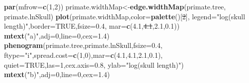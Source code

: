 \documentclass[fleqn,10pt,lineno]{wlpeerj}
\newenvironment{Shaded}{\begin{snugshade}}{\end{snugshade}}
\newcommand{\AttributeTok}[1]{\textcolor[rgb]{0.13,0.29,0.53}{#1}}
\newcommand{\ConstantTok}[1]{\textcolor[rgb]{0.56,0.35,0.01}{#1}}
\newcommand{\DecValTok}[1]{\textcolor[rgb]{0.00,0.00,0.81}{#1}}
\newcommand{\FloatTok}[1]{\textcolor[rgb]{0.00,0.00,0.81}{#1}}
\newcommand{\FunctionTok}[1]{\textcolor[rgb]{0.13,0.29,0.53}{\textbf{#1}}}
\newcommand{\NormalTok}[1]{#1}
\newcommand{\OtherTok}[1]{\textcolor[rgb]{0.56,0.35,0.01}{#1}}
\newcommand{\StringTok}[1]{\textcolor[rgb]{0.31,0.60,0.02}{#1}}
\providecommand{\DIFaddtex}[1]{{\protect\color{blue}\uwave{#1}}} %
\providecommand{\DIFdeltex}[1]{{\protect\color{red}\sout{#1}}}                      %
\providecommand{\DIFaddbegin}{} %
\providecommand{\DIFaddend}{} %
\providecommand{\DIFdelbegin}{} %
\providecommand{\DIFdelend}{} %
\providecommand{\DIFadd}[1]{\texorpdfstring{\DIFaddtex{#1}}{#1}} %
\providecommand{\DIFdel}[1]{\texorpdfstring{\DIFdeltex{#1}}{}} %
\newcommand{\DIFscaledelfig}{0.5}
\newlength{\DIFdelgraphicswidth} %
\newlength{\DIFdelgraphicsheight} %
\newcommand{\DIFaddincludegraphics}[2][]{{\color{blue}\fbox{\DIFOincludegraphics[#1]{#2}}}} %
\newcommand{\DIFdelincludegraphics}[2][]{%
\sbox{\DIFdelgraphicsbox}{\DIFOincludegraphics[#1]{#2}}%
\settoboxwidth{\DIFdelgraphicswidth}{\DIFdelgraphicsbox} %
\settoboxtotalheight{\DIFdelgraphicsheight}{\DIFdelgraphicsbox} %
\scalebox{\DIFscaledelfig}{%
\parbox[b]{\DIFdelgraphicswidth}{\usebox{\DIFdelgraphicsbox}\\[-\baselineskip] \rule{\DIFdelgraphicswidth}{0em}}\llap{\resizebox{\DIFdelgraphicswidth}{\DIFdelgraphicsheight}{%
\setlength{\unitlength}{\DIFdelgraphicswidth}%
\begin{picture}(1,1)%
\thicklines\linethickness{2pt} %
{\color[rgb]{1,0,0}\put(0,0){\framebox(1,1){}}}%
{\color[rgb]{1,0,0}\put(0,0){\line( 1,1){1}}}%
{\color[rgb]{1,0,0}\put(0,1){\line(1,-1){1}}}%
\end{picture}%
}\hspace*{3pt}}} %
} %
\DeclareRobustCommand{\DIFaddbegin}{\DIFOaddbegin \let\includegraphics\DIFaddincludegraphics} %
\DeclareRobustCommand{\DIFaddend}{\DIFOaddend \let\includegraphics\DIFOincludegraphics} %
\DeclareRobustCommand{\DIFdelbegin}{\DIFOdelbegin \let\includegraphics\DIFdelincludegraphics} %
\DeclareRobustCommand{\DIFdelend}{\DIFOaddend \let\includegraphics\DIFOincludegraphics} %
\begin{document}
\begin{Shaded}
\begin{Highlighting}[]
\FunctionTok{par}\NormalTok{(}\AttributeTok{mfrow=}\FunctionTok{c}\NormalTok{(}\DecValTok{1}\NormalTok{,}\DecValTok{2}\NormalTok{))}
\NormalTok{primate.widthMap}\OtherTok{\textless{}{-}}\FunctionTok{edge.widthMap}\NormalTok{(primate.tree,}
\NormalTok{  primate.lnSkull)}
\FunctionTok{plot}\NormalTok{(primate.widthMap,}\AttributeTok{color=}\FunctionTok{palette}\NormalTok{()[}\DIFdelbegin \DIFdel{\DecValTok{2}}\DIFdelend \DIFaddbegin \DIFadd{\DecValTok{4}}\DIFaddend \NormalTok{],}
  \AttributeTok{legend=}\StringTok{"log(skull length)"}\NormalTok{,}\AttributeTok{border=}\ConstantTok{TRUE}\NormalTok{,}\AttributeTok{fsize=}\FloatTok{0.4}\NormalTok{,}
  \AttributeTok{mar=}\FunctionTok{c}\NormalTok{(}\FloatTok{4.1}\NormalTok{,}\DIFdelbegin \DIFdel{\FloatTok{4.1}}\DIFdelend \DIFaddbegin \DIFadd{\FloatTok{1.1}}\DIFaddend \NormalTok{,}\FloatTok{2.1}\NormalTok{,}\FloatTok{0.1}\NormalTok{))}
\FunctionTok{mtext}\NormalTok{(}\StringTok{"a)"}\NormalTok{,}\AttributeTok{adj=}\DecValTok{0}\NormalTok{,}\AttributeTok{line=}\DecValTok{0}\NormalTok{,}\AttributeTok{cex=}\FloatTok{1.4}\NormalTok{)}
\FunctionTok{phenogram}\NormalTok{(primate.tree,primate.lnSkull,}\AttributeTok{fsize=}\FloatTok{0.4}\NormalTok{,}
  \AttributeTok{ftype=}\StringTok{"i"}\NormalTok{,}\AttributeTok{spread.cost=}\FunctionTok{c}\NormalTok{(}\DecValTok{1}\NormalTok{,}\DecValTok{0}\NormalTok{),}\AttributeTok{mar=}\FunctionTok{c}\NormalTok{(}\FloatTok{4.1}\NormalTok{,}\FloatTok{4.1}\NormalTok{,}\FloatTok{2.1}\NormalTok{,}\FloatTok{0.1}\NormalTok{),}
  \AttributeTok{quiet=}\ConstantTok{TRUE}\NormalTok{,}\AttributeTok{las=}\DecValTok{1}\NormalTok{,}\AttributeTok{cex.axis=}\FloatTok{0.8}\NormalTok{,}
  \AttributeTok{ylab=}\StringTok{"log(skull length)"}\NormalTok{)}
\FunctionTok{mtext}\NormalTok{(}\StringTok{"b)"}\NormalTok{,}\AttributeTok{adj=}\DecValTok{0}\NormalTok{,}\AttributeTok{line=}\DecValTok{0}\NormalTok{,}\AttributeTok{cex=}\FloatTok{1.4}\NormalTok{)}
\end{Highlighting}
\end{Shaded}
\end{document}
